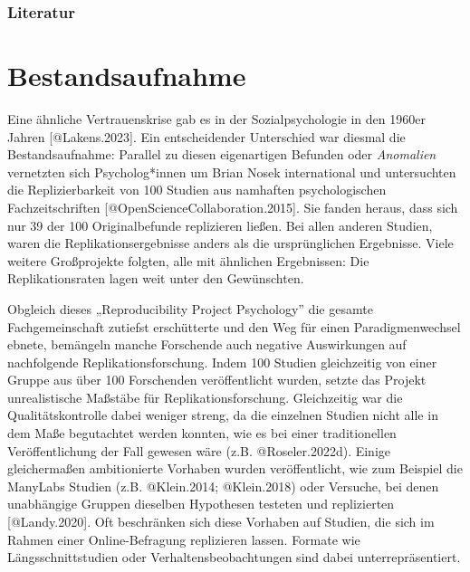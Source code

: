 \documentclass[
  letterpaper,
  DIV=11,
  numbers=noendperiod]{scrreprt}
\begin{document}
\subsection{Literatur}\label{literatur-2}

\chapter{Bestandsaufnahme}\label{bestandsaufnahme}

Eine ähnliche Vertrauenskrise gab es in der Sozialpsychologie in den
1960er Jahren {[}@Lakens.2023{]}. Ein entscheidender Unterschied war
diesmal die Bestandsaufnahme: Parallel zu diesen eigenartigen Befunden
oder \emph{Anomalien} vernetzten sich Psycholog*innen um Brian Nosek
international und untersuchten die Replizierbarkeit von 100 Studien aus
namhaften psychologischen Fachzeitschriften
{[}@OpenScienceCollaboration.2015{]}. Sie fanden heraus, dass sich nur
39 der 100 Originalbefunde replizieren ließen. Bei allen anderen
Studien, waren die Replikationsergebnisse anders als die ursprünglichen
Ergebnisse. Viele weitere Großprojekte folgten, alle mit ähnlichen
Ergebnissen: Die Replikationsraten lagen weit unter den Gewünschten.

\begin{tcolorbox}[enhanced jigsaw, bottomrule=.15mm, toprule=.15mm, opacitybacktitle=0.6, breakable, colback=white, coltitle=black, bottomtitle=1mm, toptitle=1mm, titlerule=0mm, title=\textcolor{quarto-callout-note-color}{\faInfo}\hspace{0.5em}{Kritische Betrachtung der Open Science Collaboration, 2015}, rightrule=.15mm, arc=.35mm, opacityback=0, leftrule=.75mm, left=2mm, colbacktitle=quarto-callout-note-color!10!white, colframe=quarto-callout-note-color-frame]

Obgleich dieses „Reproducibility Project Psychology'' die gesamte
Fachgemeinschaft zutiefst erschütterte und den Weg für einen
Paradigmenwechsel ebnete, bemängeln manche Forschende auch negative
Auswirkungen auf nachfolgende Replikationsforschung. Indem 100 Studien
gleichzeitig von einer Gruppe aus über 100 Forschenden veröffentlicht
wurden, setzte das Projekt unrealistische Maßstäbe für
Replikationsforschung. Gleichzeitig war die Qualitätskontrolle dabei
weniger streng, da die einzelnen Studien nicht alle in dem Maße
begutachtet werden konnten, wie es bei einer traditionellen
Veröffentlichung der Fall gewesen wäre (z.B. @Roseler.2022d). Einige
gleichermaßen ambitionierte Vorhaben wurden veröffentlicht, wie zum
Beispiel die ManyLabs Studien (z.B. @Klein.2014; @Klein.2018) oder
Versuche, bei denen unabhängige Gruppen dieselben Hypothesen testeten
und replizierten {[}@Landy.2020{]}. Oft beschränken sich diese Vorhaben
auf Studien, die sich im Rahmen einer Online-Befragung replizieren
lassen. Formate wie Längsschnittstudien oder Verhaltensbeobachtungen
sind dabei unterrepräsentiert.

\end{tcolorbox}
\end{document}
